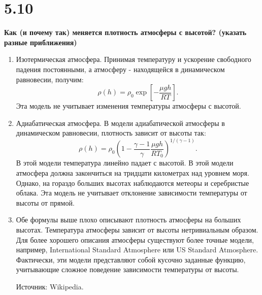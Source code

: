 \documentclass[a4paper,14pt]{article}
\begin{document}
\section*{5.10}

\begin{center}
	\LARGE{\textbf{Как (и почему так) меняется плотность атмосферы с высотой? (указать разные приближения)}}\\
\end{center}

\begin{enumerate}
    \item Изотермическая атмосфера.
    Принимая температуру и ускорение свободного падения постоянными, а атмосферу - находящейся в динамическом равновесии, получим:
    $$\rho (h) = \rho_0 \exp\left[-\frac{\mu g h}{RT}\right].$$
    Эта модель не учитывает изменения температуры атмосферы с высотой.
    
    \item Адиабатическая атмосфера.
    В модели адиабатической атмосферы в динамическом равновесии, плотность зависит от высоты так:
    $$\rho (h) = \rho_0 \left(1 - \frac{\gamma - 1}{\gamma} \frac{\mu g h}{R T_0}\right)^{1/(\gamma - 1)}.$$
    В этой модели температура линейно падает с высотой. В этой модели атмосфера должна закончиться на тридцати километрах над уровнем моря. Однако, на гораздо больших высотах наблюдаются метеоры и серебристые облака. Эта модель не учитывает отклонение зависимости температуры от высоты от прямой.
    
    \item Обе формулы выше плохо описывают плотность атмосферы на больших высотах. Температура атмосферы зависит от высоты нетривиальным образом. Для более хорошего описания атмосферы существуют более точные модели, например, International Standard Atmosphere или US Standard Atmosphere. Фактически, эти модели представляют собой кусочно заданные функцию, учитывающие сложное поведение зависимости температуры от высоты.
    
    Источник: Wikipedia.
\end{enumerate}
\end{document}
